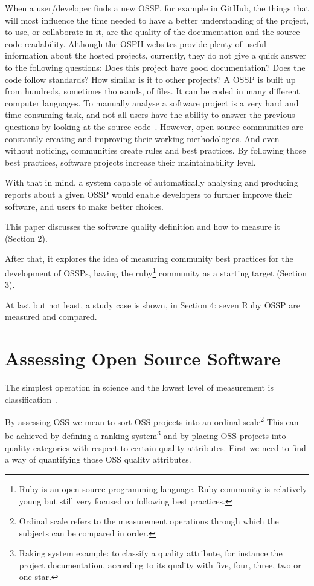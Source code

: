 \documentclass[sle]{llncs}
\begin{document}
When a user/developer finds a new OSSP, for example in 
GitHub, the things that will most influence the time needed to have a better understanding of the project, to use, or collaborate in it,
are the quality of the documentation and the source code readability.
Although the OSPH websites provide plenty of useful information about the hosted projects, 
currently, they do not give a quick answer to the following questions: 
Does this project have good documentation? Does the code follow standards? How similar is it to other projects? 
A OSSP is built up from hundreds, sometimes thousands, of files. It can be coded in many different computer languages.
To manually analyse a software project is a very hard and time consuming task,
and not all users have the ability to answer the previous questions by looking at the source code~\cite{crowston2003defining}.
However, open source communities are constantly creating and improving their working methodologies. 
And even without noticing, communities create rules and best practices. 
By following those best practices, software projects increase their maintainability level.   

With that in mind, a system capable of automatically analysing and producing reports about a given OSSP would enable developers to further improve their software,
and users to make better choices. 

This paper discusses the software quality definition and how to measure it (Section 2). 

After that, it explores the idea of measuring community best practices for the development of OSSPs,
having the 
\textsf{ruby}\footnote{Ruby is an open source programming language. Ruby community is relatively young but still very focused on following best practices.  } 
community as a starting target (Section 3).

At last but not least, a study case is shown, in Section 4: seven Ruby OSSP are measured and compared.


\section{Assessing Open Source Software}
The simplest operation in science and the lowest level of measurement is classification~\cite{kan2002metrics}. 

By assessing OSS we mean to sort OSS projects into an 
\textsf{ordinal scale}\footnote{Ordinal scale refers to the measurement operations through which the subjects can be compared in order.}
This can be achieved by defining a 
\textsf{ranking system}\footnote{
  Raking system example: to classify a quality attribute, for instance the project documentation, according to its quality with 
  five, four, three, two or one star.
} and by placing OSS projects into quality categories with respect to certain quality attributes.
First we need to find a way of quantifying those OSS quality attributes.
\end{document}
